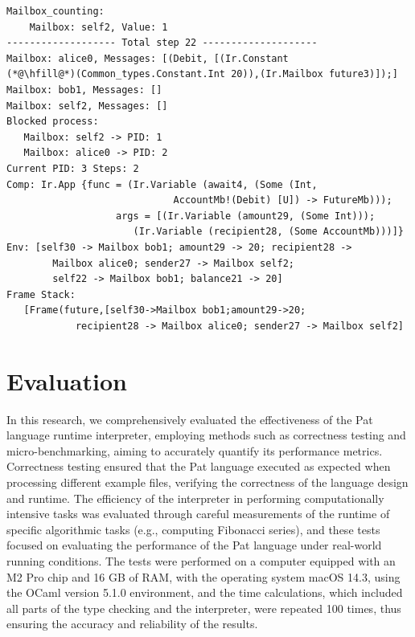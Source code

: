 \documentclass{l4proj}
\begin{document}
\noindent\begin{minipage}{\linewidth}
\lstset{style=printer,}
\begin{lstlisting}[caption={Example of evaluation step printer output}, label={lst:output}]
Mailbox_counting:
    Mailbox: self2, Value: 1
------------------- Total step 22 --------------------
Mailbox: alice0, Messages: [(Debit, [(Ir.Constant 
(*@\hfill@*)(Common_types.Constant.Int 20)),(Ir.Mailbox future3)]);]
Mailbox: bob1, Messages: []
Mailbox: self2, Messages: []
Blocked process:
   Mailbox: self2 -> PID: 1 
   Mailbox: alice0 -> PID: 2 
Current PID: 3 Steps: 2
Comp: Ir.App {func = (Ir.Variable (await4, (Some (Int, 
                             AccountMb!(Debit) [U]) -> FutureMb)));
                   args = [(Ir.Variable (amount29, (Some Int)));
                      (Ir.Variable (recipient28, (Some AccountMb)))]}
Env: [self30 -> Mailbox bob1; amount29 -> 20; recipient28 -> 
        Mailbox alice0; sender27 -> Mailbox self2; 
        self22 -> Mailbox bob1; balance21 -> 20]
Frame Stack: 
   [Frame(future,[self30->Mailbox bob1;amount29->20; 
            recipient28 -> Mailbox alice0; sender27 -> Mailbox self2]
\end{lstlisting}
\end{minipage}



\chapter{Evaluation} 
In this research, we comprehensively evaluated the effectiveness of the Pat language runtime interpreter, employing methods such as correctness testing and micro-benchmarking, aiming to accurately quantify its performance metrics. Correctness testing ensured that the Pat language executed as expected when processing different example files, verifying the correctness of the language design and runtime. The efficiency of the interpreter in performing computationally intensive tasks was evaluated through careful measurements of the runtime of specific algorithmic tasks (e.g., computing Fibonacci series), and these tests focused on evaluating the performance of the Pat language under real-world running conditions. The tests were performed on a computer equipped with an M2 Pro chip and 16 GB of RAM, with the operating system macOS 14.3, using the OCaml version 5.1.0 environment, and the time calculations, which included all parts of the type checking and the interpreter, were repeated 100 times, thus ensuring the accuracy and reliability of the results.
\end{document}
